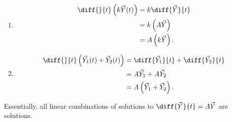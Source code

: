 \documentclass[10pt]{mypackage}
\begin{document}
\begin{example}\hfill
  \begin{enumerate}[(1)]
    \item 
      \begin{align*}
        \diff{}{t}\left(k\vec{Y}(t)\right) &=  k \diff{\vec{Y}}{t}\\
                                           &= k\left(A\vec{Y}\right)\\
                                           &= A\left(k\vec{Y}\right).
      \end{align*}
    \item 
      \begin{align*}
        \diff{}{t}\left(\vec{Y}_1(t) + \vec{Y}_2(t)\right) &= \diff{\vec{Y}_1}{t} + \diff{\vec{Y}_2}{t}\\
                                                           &= A\vec{Y}_1 + A\vec{Y}_2\\
                                                           &= A\left(\vec{Y}_1 + \vec{Y}_2\right).
      \end{align*}
  \end{enumerate}
\end{example}
Essentially, all linear combinations of solutions to $\diff{\vec{Y}}{t} = A\vec{Y} $ are solutions.
\end{document}
